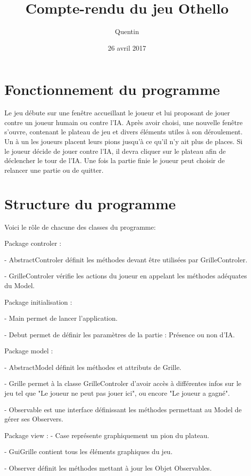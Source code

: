 \documentclass{report}
\title{Compte-rendu du jeu Othello}
\author{Quentin \bsc{SAUVAGE}}
\date{26 avril 2017}
\begin{document}
\maketitle
\chapter{Fonctionnement du programme}
Le jeu débute sur une fenêtre accueillant le joueur et lui proposant de jouer contre un joueur humain ou contre l'IA. Après avoir choisi, une nouvelle fenêtre s'ouvre, contenant le plateau de jeu et divers éléments utiles à son déroulement. Un à un les joueurs placent leurs pions jusqu'à ce qu'il n'y ait plus de places. Si le joueur décide de jouer contre l'IA, il devra cliquer sur le plateau afin de déclencher le tour de l'IA. Une fois la partie finie le joueur peut choisir de relancer une partie ou de quitter.

\chapter{Structure du programme}

Voici le rôle de chacune des classes du programme:

\medbreak
Package controler :

- AbstractControler définit les méthodes devant être utilisées par GrilleControler.

- GrilleControler vérifie les actions du joueur en appelant les méthodes adéquates du Model.

\medbreak
Package initialisation :

- Main permet de lancer l'application.

- Debut permet de définir les paramètres de la partie : Présence ou non d'IA.

\medbreak
Package model :

- AbstractModel définit les méthodes et attributs de Grille.

- Grille permet à la classe GrilleControler d'avoir accès à différentes infos sur le jeu tel que "Le joueur ne peut pas jouer ici", ou encore "Le joueur a gagné".

- Observable est une interface définissant les méthodes permettant au Model de gérer ses Observers. 

\medbreak
Package view :
- Case représente graphiquement un pion du plateau.

- GuiGrille contient tous les éléments graphiques du jeu.

- Observer définit les méthodes mettant à jour les Objet Observables.
\end{document}

